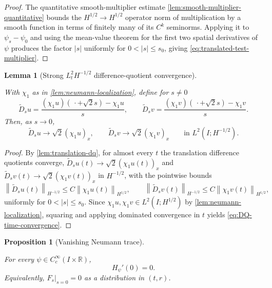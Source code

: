\documentclass[11pt,oneside]{book}
\providecommand{\uses}[1]{}
\newtheorem{proposition}[theorem]{Proposition}
\newtheorem{lemma}[theorem]{Lemma}
\theoremstyle{definition}
\theoremstyle{remark}
\newcommand{\R}{\mathbb R}
\newcommand{\1}{\mathbf 1}
\newcommand{\norm}[1]{\left\lVert #1\right\rVert}
\newcommand{\abs}[1]{\left\lvert #1\right\rvert}
\begin{document}
\begin{proof}
\uses{lem:smooth-multiplier-quantitative}
The quantitative smooth-multiplier estimate \cref{lem:smooth-multiplier-quantitative}
bounds the $H^{1/2}\to H^{1/2}$ operator norm of multiplication by a smooth
function in terms of finitely many of its $C^k$ seminorms. Applying it to
$\psi_s-\psi_0$ and using the mean-value theorem for the first two spatial
derivatives of $\psi$ produces the factor $\abs s$ uniformly for
$0<\abs s\le s_0$, giving \eqref{eq:translated-test-multiplier}.
\end{proof}

\begin{lemma}[Strong $L^2_tH^{-1/2}$ difference-quotient convergence]\label{lem:neumann-strong-convergence}
\uses{lem:translated-test-multiplier, def:Hs-neg-pairing, lem:translation-dq}
With $\chi_1$ as in \cref{lem:neumann-localization}, define for $s\ne0$
\[
 \widetilde D_su=\frac{(\chi_1u)(\,\cdot+\sqrt2s)-\chi_1u}{s},\qquad
 \widetilde D_sv=\frac{(\chi_1v)(\,\cdot+\sqrt2s)-\chi_1v}{s}.
\]
Then, as $s\to0$,
\begin{equation}
 \widetilde D_su\longrightarrow\sqrt2(\chi_1u)_x,\qquad
 \widetilde D_sv\longrightarrow\sqrt2(\chi_1v)_x
 \qquad\text{in }L^2(I;H^{-1/2}). \label{eq:DQ-time-convergence}
\end{equation}
\end{lemma}

\begin{proof}
\uses{lem:translation-dq, lem:neumann-localization}
By \cref{lem:translation-dq}, for almost every $t$ the translation difference
quotients converge, $\widetilde D_su(t)\to\sqrt2(\chi_1u(t))_x$ and
$\widetilde D_sv(t)\to\sqrt2(\chi_1v(t))_x$ in $H^{-1/2}$, with the pointwise
bounds
\[
 \norm{\widetilde D_su(t)}_{H^{-1/2}}\le C\norm{\chi_1u(t)}_{H^{1/2}},\qquad
 \norm{\widetilde D_sv(t)}_{H^{-1/2}}\le C\norm{\chi_1v(t)}_{H^{1/2}},
\]
uniformly for $0<\abs s\le s_0$. Since $\chi_1u,\chi_1v\in L^2(I;H^{1/2})$ by
\cref{lem:neumann-localization}, squaring and applying dominated convergence in
$t$ yields \eqref{eq:DQ-time-convergence}.
\end{proof}

\begin{proposition}[Vanishing Neumann trace]\label{prop:Neumann-trace}
\uses{def:neumann-trace}
For every $\psi\in C_c^\infty(I\times\R)$,
\[
 H_\psi'(0)=0.
\]
Equivalently, $F_s|_{s=0}=0$ as a distribution in $(t,r)$.
\end{proposition}
\end{document}
